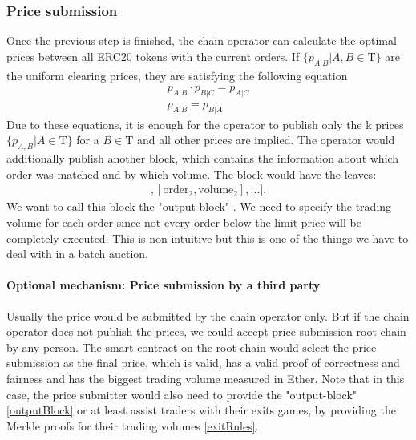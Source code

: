 \documentclass[11pt,parskip=full]{scrartcl}%
\newcommand{\Tau}{\mathrm{T}}
\begin{document}
\subsubsection{Price submission}
Once the previous step is finished, the chain operator can calculate the optimal prices between all ERC20 tokens with the current orders. If $\{p_{A|B}| A,B \in \Tau \}$  are the uniform clearing prices, they are satisfying the following equation
\begin{align}
    \label{eq:arbitrage_freeness}
  p_{A|B} \cdot p_{B|C} = p_{A|C}\\
  p_{A|B} = p_{B|A}
\end{align}
Due to these equations, it is enough for the operator to publish only the k prices $\{p_{A,B}| A \in \Tau \}$ for a $B\in \Tau$ and all other prices are implied. \newline
The operator would additionally publish another block, which contains the information about which order was matched and by which volume. The block would have the leaves:
\begin{align}
	[[\text{order}_1, \text{volume}_1], [\text{order}_2, \text{volume}_2],...].
\end{align} 
We want to call this block the "output-block" \label{outputBlock}. 
We need to specify the trading volume for each order since not every order below the limit price will be completely executed. This is non-intuitive but this is one of the things we have to deal with in a batch auction.
\paragraph{Optional mechanism: Price submission by a third party} Usually the price would be submitted by the chain operator only. But if the chain operator does not publish the prices, we could accept price submission root-chain by any person. The smart contract on the root-chain would select the price submission as the final price, which is valid, has a valid proof of correctness and fairness and has the biggest trading volume measured in Ether. \newline
Note that in this case, the price submitter would also need to provide the "output-block" \ref{outputBlock} or at least assist traders with their exits games, by providing the Merkle proofs for their trading volumes \ref{exitRules}.
\end{document}
